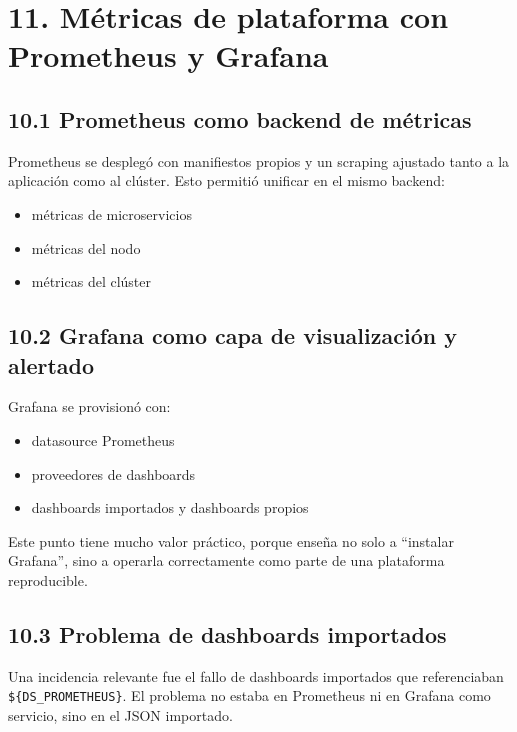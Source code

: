 \documentclass[
a4paper,
12pt]{report}
\providecommand{\tightlist}{%
  \setlength{\itemsep}{0pt}\setlength{\parskip}{0pt}}
\begin{document}
\chapter{11. Métricas de plataforma con Prometheus y
Grafana}\label{muxe9tricas-de-plataforma-con-prometheus-y-grafana}

\section{10.1 Prometheus como backend de
métricas}\label{prometheus-como-backend-de-muxe9tricas}

Prometheus se desplegó con manifiestos propios y un scraping ajustado
tanto a la aplicación como al clúster. Esto permitió unificar en el
mismo backend:

\begin{itemize}
\tightlist
\item
  métricas de microservicios
\item
  métricas del nodo
\item
  métricas del clúster
\end{itemize}

\section{10.2 Grafana como capa de visualización y
alertado}\label{grafana-como-capa-de-visualizaciuxf3n-y-alertado}

Grafana se provisionó con:

\begin{itemize}
\tightlist
\item
  datasource Prometheus
\item
  proveedores de dashboards
\item
  dashboards importados y dashboards propios
\end{itemize}

Este punto tiene mucho valor práctico, porque enseña no solo a
``instalar Grafana'', sino a operarla correctamente como parte de una
plataforma reproducible.

\section{10.3 Problema de dashboards
importados}\label{problema-de-dashboards-importados}

Una incidencia relevante fue el fallo de dashboards importados que
referenciaban \texttt{\$\{DS\_PROMETHEUS\}}. El problema no estaba en
Prometheus ni en Grafana como servicio, sino en el JSON importado.
\end{document}
